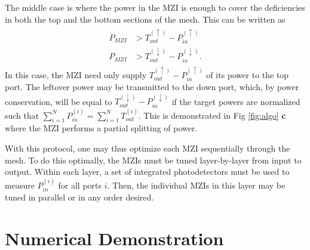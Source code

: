\documentclass[%
 reprint,
 amsmath,amssymb,
 aps,
prstab,
floatfix,
]{revtex4-1}
\begin{document}
The middle case is where the power in the MZI is enough to cover the deficiencies in both the top and the bottom sections of the mesh.  This can be written as
\begin{align}
\begin{split}
    P_{MZI} &> T_{out}^{(\uparrow)} -  P_{in}^{(\uparrow)} \\
    P_{MZI} &> T_{out}^{(\downarrow)} - P_{in}^{(\downarrow)}.
\end{split}
\end{align}
In this case, the MZI need only supply $T_{out}^{(\uparrow)} - P_{in}^{(\uparrow)}$ of its power to the top port.  The leftover power may be transmitted to the down port, which, by power conservation, will be equal to $T_{out}^{(\downarrow)} - P_{in}^{(\downarrow)}$ if the target powers are normalized such that $\sum_{i=1}^{N}P_{in}^{(i)} = \sum_{i=1}^{N}T_{out}^{(i)}$.  This is demonstrated in Fig \ref{fig:algo} \textbf{c} where the MZI performs a partial splitting of power.

With this protocol, one may thus optimize each MZI sequentially through the mesh.  To do this optimally, the MZIs must be tuned layer-by-layer from input to output.  Within each layer, a set of integrated photodetectors must be used to measure $P_{in}^{(i)}$ for all ports $i$.  Then, the individual MZIs in this layer may be tuned in parallel or in any order desired.

\section{\label{sec:demo}Numerical Demonstration}
\end{document}

